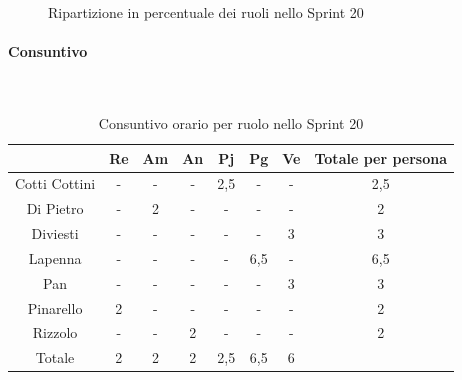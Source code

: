 \documentclass{article}
\begin{document}
            \begin{figure}[H]
                \centering
                \caption{Ripartizione in percentuale dei ruoli nello Sprint 20}
            \end{figure}


            \paragraph{Consuntivo}\mbox{}\\
            \begin{table}[H]
                \centering
                \begin{tabular}{|c|c|c|c|c|c|c|c|}
                \hline
                                & Re  & Am  & An  & Pj  & Pg  & Ve  & Totale per persona \\ \hline
                Cotti Cottini & -   & -   & -   & 2,5 & -   & -   & 2,5                \\ \hline
                Di Pietro     & -   & 2   & -   & -   & -   & -   & 2                  \\ \hline
                Diviesti      & -   & -   & -   & -   & -   & 3   & 3                  \\ \hline
                Lapenna       & -   & -   & -   & -   & 6,5 & -   & 6,5                \\ \hline
                Pan           & -   & -   & -   & -   & -   & 3   & 3                  \\ \hline
                Pinarello     & 2   & -   & -   & -   & -   & -   & 2                  \\ \hline
                Rizzolo       & -   & -   & 2   & -   & -   & -   & 2                  \\ \hline
                Totale        & 2   & 2   & 2   & 2,5 & 6,5 & 6   &                    \\ \hline
                \end{tabular}
                \caption{Consuntivo orario per ruolo nello Sprint 20}
            \end{table}

\end{document}
